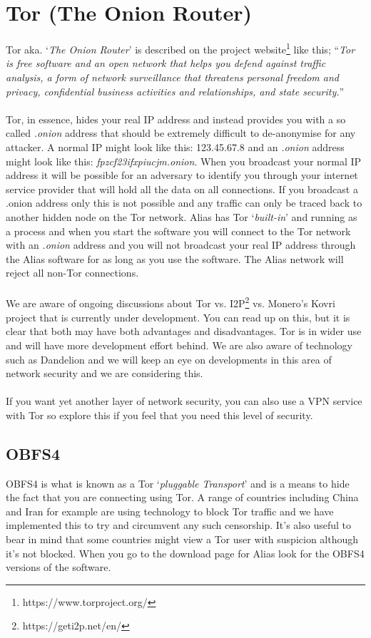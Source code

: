 \section{Tor (The Onion Router)}
Tor aka. ‘\textit{The Onion Router}’ is described on the project
website\footnote{https://www.torproject.org/ } like this; “\textit{Tor is
free software and an open network that helps you defend against traffic
analysis, a form of network surveillance that threatens personal freedom
and privacy, confidential business activities and relationships, and
state security.}”
\\
\\
\noindent
Tor, in essence, hides your real IP address and instead provides you with
a so called \textit{.onion} address that should be extremely difficult to
de-anonymise for any attacker. A normal IP might look like this: 123.45.67.8
and an \textit{.onion} address might look like this:
\textit{fpzcf23ifxpiucjm.onion}. When you broadcast your normal IP address
it will be possible for an adversary to identify you through your internet
service provider that will hold all the data on all connections. If you
broadcast a .onion address only this is not possible and any traffic can
only be traced back to another hidden node on the Tor network. Alias
has Tor ‘\textit{built-in}’ and running as a process and when you start the
software you will connect to the Tor network with an \textit{.onion} address
and you will not broadcast your real IP address through the Alias
software for as long as you use the software. The Alias network will
reject all non-Tor connections.
\\
\\
\noindent
We are aware of ongoing discussions about Tor vs. I2P\footnote{https://geti2p.net/en/}
vs. Monero’s Kovri project that is currently under development. You can
read up on this, but it is clear that both may have both advantages and
disadvantages. Tor is in wider use and will have more development effort
behind. We are also aware of technology such as Dandelion and we will keep
an eye on developments in this area of network security and we are
considering this.
\\
\\
\noindent
If you want yet another layer of network security, you can also use a VPN
service with Tor so explore this if you feel that you need this level of
security.


\subsection{OBFS4}
OBFS4 is what is known as a Tor ‘\textit{pluggable Transport}’ and is a
means to hide the fact that you are connecting using Tor. A range of
countries including China and Iran for example are using technology to
block Tor traffic and we have implemented this to try and circumvent any
such censorship. It’s also useful to bear in mind that some countries might
view a Tor user with suspicion although it’s not blocked. When you go to
the download page for Alias look for the OBFS4 versions of the
software.



